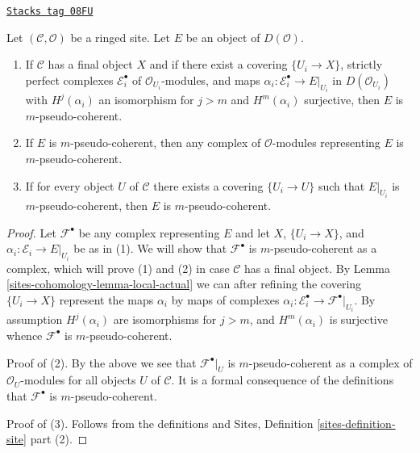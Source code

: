 \begin{lemma}
\label{sites-cohomology-lemma-pseudo-coherent-independent-representative}
\href{https://stacks.math.columbia.edu/tag/08FU}{\texttt{Stacks tag 08FU}}

Let $(\mathcal{C}, \mathcal{O})$ be a ringed site.
Let $E$ be an object of $D(\mathcal{O})$.
\begin{enumerate}
\item If $\mathcal{C}$ has a final object $X$ and if there exist a covering
$\{U_i \to X\}$, strictly perfect complexes $\mathcal{E}_i^\bullet$ of
$\mathcal{O}_{U_i}$-modules, and
maps $\alpha_i : \mathcal{E}_i^\bullet \to E|_{U_i}$ in
$D(\mathcal{O}_{U_i})$ with $H^j(\alpha_i)$ an isomorphism for $j > m$
and $H^m(\alpha_i)$ surjective, then $E$ is $m$-pseudo-coherent.
\item If $E$ is $m$-pseudo-coherent, then any complex of $\mathcal{O}$-modules
representing $E$ is $m$-pseudo-coherent.
\item If for every object $U$ of $\mathcal{C}$ there exists a covering
$\{U_i \to U\}$ such that $E|_{U_i}$ is $m$-pseudo-coherent, then
$E$ is $m$-pseudo-coherent.
\end{enumerate}
\end{lemma}

\begin{proof}
Let $\mathcal{F}^\bullet$ be any complex representing $E$
and let $X$, $\{U_i \to X\}$, and $\alpha_i : \mathcal{E}_i \to E|_{U_i}$
be as in (1). We will show that $\mathcal{F}^\bullet$ is $m$-pseudo-coherent
as a complex, which will prove (1) and (2) in case $\mathcal{C}$ has a
final object. By Lemma \ref{sites-cohomology-lemma-local-actual}
we can after refining the covering $\{U_i \to X\}$
represent the maps $\alpha_i$ by maps of complexes
$\alpha_i : \mathcal{E}_i^\bullet \to \mathcal{F}^\bullet|_{U_i}$.
By assumption
$H^j(\alpha_i)$ are isomorphisms for $j > m$, and $H^m(\alpha_i)$
is surjective whence $\mathcal{F}^\bullet$ is
$m$-pseudo-coherent.

\medskip\noindent
Proof of (2). By the above we see that $\mathcal{F}^\bullet|_U$ is
$m$-pseudo-coherent as a complex of $\mathcal{O}_U$-modules for all
objects $U$ of $\mathcal{C}$. It is a formal consequence of the definitions
that $\mathcal{F}^\bullet$ is $m$-pseudo-coherent.

\medskip\noindent
Proof of (3). Follows from the definitions and
Sites, Definition \ref{sites-definition-site} part (2).
\end{proof}

